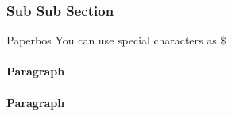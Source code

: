 \documentclass{jdrp}
\newcommand*{\crg}{{\aurebesh\Large \$}} %
\begin{document}
    \clearpage %
    \subsubsection{Sub Sub Section}
    \begin{paperbox}{Paperbos}
    You can use special characters as \crg
    \end{paperbox}
    
    \paragraph{Paragraph}
    \lipsum[4]

    \paragraph{Paragraph}
    \lipsum[5]

    \onecolumn
    \nocite{*}
    \printbibliography
\end{document}
